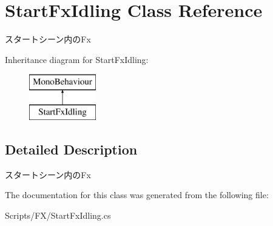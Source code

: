 \hypertarget{class_start_fx_idling}{}\section{Start\+Fx\+Idling Class Reference}
\label{class_start_fx_idling}


スタートシーン内の\+Fx  


Inheritance diagram for Start\+Fx\+Idling\+:\begin{figure}[H]
\begin{center}
\leavevmode
\includegraphics[height=2.000000cm]{class_start_fx_idling}
\end{center}
\end{figure}


\subsection{Detailed Description}
スタートシーン内の\+Fx 



The documentation for this class was generated from the following file\+:\begin{DoxyCompactItemize}
\item 
Scripts/\+F\+X/Start\+Fx\+Idling.\+cs\end{DoxyCompactItemize}
